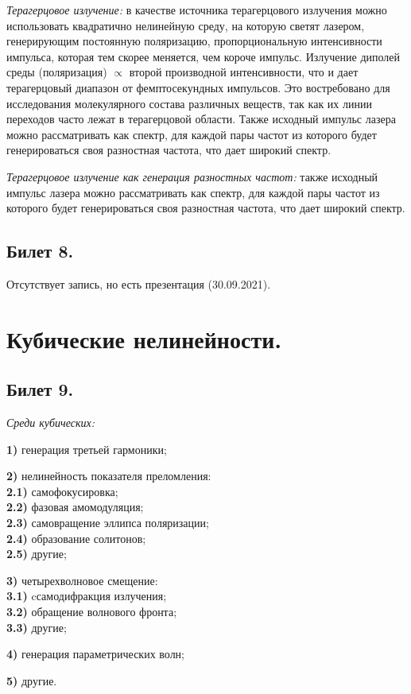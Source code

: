 \documentclass[a4paper,12pt]{article}
\theoremstyle{definition} %
\theoremstyle{definition} %
\theoremstyle{remark} %
\begin{document}
\textit{Терагерцовое излучение:} в качестве источника терагерцового излучения можно использовать квадратично нелинейную среду, на которую светят лазером, генерирующим постоянную поляризацию, пропорциональную интенсивности импульса, которая тем скорее меняется, чем короче импульс. Излучение диполей среды (поляризация) $\propto$ второй производной интенсивности, что и дает терагерцовый диапазон от фемптосекундных импульсов. Это востребовано для исследования молекулярного состава различных веществ, так как их линии переходов часто лежат в терагерцовой области. Также исходный импульс лазера можно рассматривать как спектр, для каждой пары частот из которого будет генерироваться своя разностная частота, что дает широкий спектр.


\textit{Терагерцовое излучение как генерация разностных частот:} также исходный импульс лазера можно рассматривать как спектр, для каждой пары частот из которого будет генерироваться своя разностная частота, что дает широкий спектр.


\subsection{Билет 8.}

Отсутствует запись, но есть презентация (30.09.2021).

\section{Кубические нелинейности.}
\subsection{Билет 9.}


\textit{Среди кубических:}\\
	\par \textbf{1)} генерация третьей гармоники; \\
	\par \textbf{2)} нелинейность показателя преломления: \\
	 \textbf{2.1)} самофокусировка; \\
	 \textbf{2.2)} фазовая амомодуляция; \\
 	 \textbf{2.3)} самовращение эллипса поляризации; \\
	 \textbf{2.4)} образование солитонов; \\
	 \textbf{2.5)} другие; \\
	\par \textbf{3)} четырехволновое смещение: \\
	 \textbf{3.1)} cсамодифракция излучения; \\
	 \textbf{3.2)} обращение волнового фронта; \\
	 \textbf{3.3)} другие; \\
	\par \textbf{4)} генерация параметрических волн; \\
	\par \textbf{5)} другие.
\end{document}
